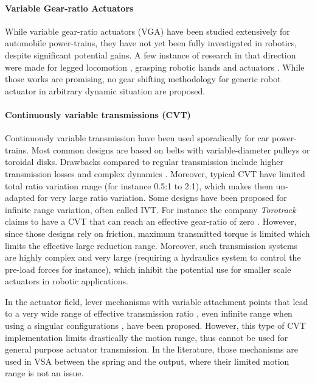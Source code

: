 
\paragraph{Variable Gear-ratio Actuators} 
While variable gear-ratio actuators (VGA) have been studied extensively for automobile power-trains, they have not yet been fully investigated in robotics, despite significant potential gains. A few instance of research in that direction were made for legged locomotion \cite{hirose_design_1991}, grasping robotic hands \cite{shin_robot_2012} and actuators \cite{hirose_development_1999} \cite{kim_improved_2007} \cite{tahara_high-backdrivable_2011}. While those works are promising, no gear shifting methodology for generic robot actuator in arbitrary dynamic situation are proposed.


\paragraph{Continuously variable transmissions (CVT)} 

Continuously variable transmission have been used sporadically for car power-trains. Most common designs are based on belts with variable-diameter pulleys or toroidal disks. Drawbacks compared to regular transmission include higher transmission losses and complex dynamics \cite{srivastava_review_2009}. Moreover, typical CVT have limited total ratio variation range (for instance 0.5:1 to 2:1), which makes them un-adapted for very large ratio variation. Some designs have been proposed for infinite range variation, often called IVT. For instance the company \textit{Torotrack} claims to have a CVT that can reach an effective gear-ratio of zero \cite{schoolcraft_gear_2011}. However, since those designs rely on friction, maximum transmitted torque is limited which limits the effective large reduction range. Moreover, such transmission systems are highly complex and very large (requiring a hydraulics system to control the pre-load forces for instance), which inhibit the potential use for smaller scale actuators in robotic applications. 


In the actuator field, lever mechanisms with variable attachment points that lead to a very wide range of effective transmission ratio \cite{tahara_high-backdrivable_2011}, even infinite range when using a singular configurations \cite{jafari_new_2014}, have been proposed. However, this type of CVT implementation limits drastically the motion range, thus cannot be used for general purpose actuator transmission. In the literature, those mechanisms are used in VSA between the spring and the output, where their limited motion range is not an issue. 

